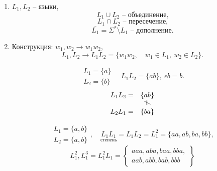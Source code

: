 \begin{remark}[Конструкции]\leavevmode
    \begin{enumerate}
        \item $ L_1,L_2 $ -- языки,
              \[
                  L_1 \cup L_2 \text{ -- объединение,}
              \]
              \[
                  L_1 \cap L_2 \text{ -- пересечение,}
              \]
              \[
                  \overline{L_1} = \Sigma^* \setminus L_1 \text{ -- дополнение.}
              \]
        \item Конструкция: $ w_1,w_2 \longrightarrow w_1w_2 $,
              \[
                  L_1,L_2 \longrightarrow L_1L_2 = \{w_1w_2,\quad w_1\in L_1, \ w_2 \in L_2\}.
              \]

              \begin{example}
                  \[
                      \begin{array}{l}
                          L_1 = \{a\} \\
                          L_2 = \{b\}
                      \end{array} \quad L_1L_2 = \{ab\}, \ \epsilon b = b.
                  \]
                  \[
                      \begin{array}{rc}
                          L_1L_2 = & \{ab\}   \\
                                   & \vertneq \\
                          L_2L_1 = & \{ba\}
                      \end{array}
                  \]
              \end{example}

              \begin{example}
                  \[
                      \begin{array}{l}
                          L_1 = \{a,b\} \\
                          L_2 = \{a,b\}
                      \end{array}, \quad \underset{\text{степень}}{L_1L_1} = L_1L_2 = L_1^2 = \{aa,ab,ba,bb\},
                  \]
                  \[
                      L_1^2,L_1^3 = L_1^2L_1 = \left\{\begin{array}{l}
                          aaa,aba,baa,bba, \\
                          aab,abb,bab,bbb
                      \end{array}\right\}
                  \]
              \end{example}


\end{enumerate}
\end{remark}
